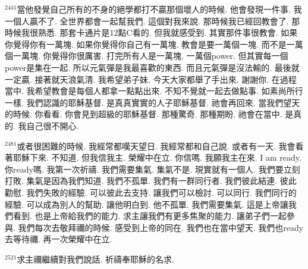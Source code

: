 \documentclass{book}
\begin{document}
$^{2441}$當他發覺自己所有的不身的絕學都打不贏那個壞人的時候.
他會發現一件事.
我一個人贏不了.
全世界都會一起幫我們.
這個對我來說.
那時候我已經回教會了.
那時候我很熟悉.
那套卡通片是12點C看的.
但我就感受到.
其實那件事很教會.
如果你覺得你有一萬塊.
如果你覺得你自己有一萬塊.
教會是要一萬個一塊.
而不是一萬個一萬塊.
你覺得你很厲害.
打完所有人是一萬塊.
一萬個power.
但其實每一個power是集在一起.
所以元氣彈是我最喜歡的東西.
而且元氣彈是沒法輸的.
最後就一定贏.
接著就天浪氣清.
我希望弟子妹.
今天大家都舉了手出來.
謝謝你.
在過程當中.
我希望教會是每個人都拿一點點出來.
不知不覺就一起去做點事.
如素尚所行一樣.
我們認識的耶穌基督.
是真真實實的人子耶穌基督.
祂會再回來.
當我們望天的時候.
你看看.
你會見到超級的耶穌基督.
那種驚奇.
那種期盼.
祂會在當中.
是真的.
我自己很不開心.

$^{2481}$或者很困難的時候.
我經常都嘆天望日.
我經常都和自己說.
或者有一天.
我會看著耶穌下來.
不知道.
但我信我主.
榮耀中在立.
你信嗎.
我願我主在來.
I am ready.
你ready嗎.
我第一次祈禱.
我們需要集氣.
集氣不是.
現實就有一個人.
我們要立刻打敗.
集氣是因為我們知道.
我們不孤單.
我們有一群同行者.
我們彼此結連.
彼此勸慰.
我們失敗的經驗.
可以彼此去支持.
讓我們可以檢討.
可以同行.
我們同行的經驗.
可以成為別人的幫助.
讓他明白到.
他不孤單.
我們需要集氣.
這是上帝讓我們看到.
也是上帝給我們的能力.
求主讓我們有更多焦聚的能力.
讓弟子們一起參與.
我們每次去敬拜禰的時候.
感受到上帝的同在.
我們也在當中望天.
我們也ready去等待禰.
再一次榮耀中在立.

$^{2521}$求主禰繼續對我們說話.
祈禱奉耶穌的名求.
\newpage
\end{document}
